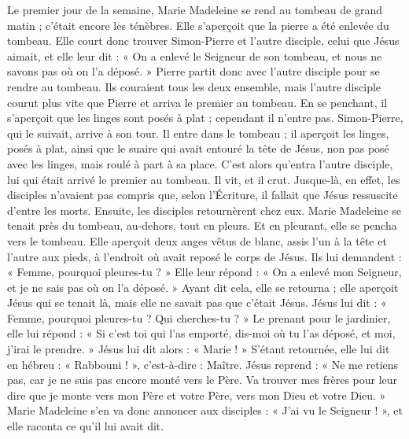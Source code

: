 Le premier jour de la semaine, Marie Madeleine se rend au tombeau de grand matin ;
	c’était encore les ténèbres.
Elle s’aperçoit que la pierre a été enlevée du tombeau.
Elle court donc trouver Simon-Pierre et l’autre disciple, celui que Jésus aimait,
	et elle leur dit : « On a enlevé le Seigneur de son tombeau,
	et nous ne savons pas où on l’a déposé. »
Pierre partit donc avec l’autre disciple pour se rendre au tombeau.
Ils couraient tous les deux ensemble,
	mais l’autre disciple courut plus vite que Pierre et arriva le premier au tombeau.
En se penchant, il s’aperçoit que les linges sont posés à plat ; cependant il n’entre pas.
	Simon-Pierre, qui le suivait, arrive à son tour.
Il entre dans le tombeau ; il aperçoit les linges, posés à plat,
	ainsi que le suaire qui avait entouré la tête de Jésus,
	non pas posé avec les linges, mais roulé à part à sa place.
C’est alors qu’entra l’autre disciple, lui qui était arrivé le premier au tombeau.
Il vit, et il crut.
Jusque-là, en effet, les disciples n’avaient pas compris 
	que, selon l’Écriture, il fallait que Jésus ressuscite d’entre les morts.
Ensuite, les disciples retournèrent chez eux.
Marie Madeleine se tenait près du tombeau, au-dehors, tout en pleurs.
Et en pleurant, elle se pencha vers le tombeau.
Elle aperçoit deux anges vêtus de blanc, assis l’un à la tête et l’autre aux pieds,
	à l’endroit où avait reposé le corps de Jésus.
Ils lui demandent : « Femme, pourquoi pleures-tu ? »
Elle leur répond : « On a enlevé mon Seigneur, et je ne sais pas où on l’a déposé. »
Ayant dit cela, elle se retourna ;
	elle aperçoit Jésus qui se tenait là, mais elle ne savait pas que c’était Jésus.
Jésus lui dit : « Femme, pourquoi pleures-tu ? Qui cherches-tu ? »
Le prenant pour le jardinier, elle lui répond :
	« Si c’est toi qui l’as emporté, dis-moi où tu l’as déposé, et moi, j’irai le prendre. »
Jésus lui dit alors : « Marie ! »
	S’étant retournée, elle lui dit en hébreu : « Rabbouni ! », c’est-à-dire : Maître.
Jésus reprend : « Ne me retiens pas, car je ne suis pas encore monté vers le Père.
Va trouver mes frères
	pour leur dire que je monte vers mon Père et votre Père, vers mon Dieu et votre Dieu. »
Marie Madeleine s’en va donc annoncer aux disciples : « J’ai vu le Seigneur ! »,
	et elle raconta ce qu’il lui avait dit.